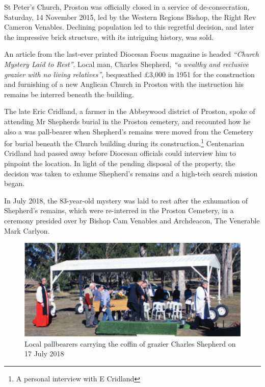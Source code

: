 St Peter's Church, Proston was officially closed in a service of de-consecration, Saturday, 14 November 2015, led by the Western Regions Bishop, the Right Rev Cameron Venables. Declining population led to this regretful decision, and later the impressive brick structure, with its intriguing history, was sold.



An article from the last-ever printed Diocesan Focus magazine is headed \emph{``Church Mystery Laid to Rest''}. Local man, Charles Shepherd, \emph{``a wealthy and reclusive grazier with no living relatives''}, bequeathed \pounds3,000 in 1951 for the construction and furnishing of a new Anglican Church in Proston with the instruction his remains be interred beneath the building.



The late Eric Cridland, a farmer in the Abbeywood district of Proston, spoke of attending Mr Shepherds burial in the Proston cemetery, and recounted how he also a was pall-bearer when Shepherd's remains were moved from the Cemetery for burial beneath the Church building during its construction.\footnote{A personal interview with E Cridland} Centenarian Cridland had passed away before Diocesan officials could interview him to pinpoint the location. In light of the pending disposal of the property, the decision was taken to exhume Shepherd's remains and a high-tech search mission began.


In July 2018, the 83-year-old mystery was laid to rest after the exhumation of Shepherd's remains, which were re-interred in the Proston Cemetery, in a ceremony presided over by Bishop Cam Venables and Archdeacon, The Venerable Mark Carlyon.









\begin{figure}[!htb]
\begin{center}
\includegraphics[width=1.\textwidth,center]{../images/charlesShepherd.jpg}
\caption{Local pallbearers carrying the coffin of grazier Charles Shepherd on 17 July 2018}
\end{center}
\end{figure}




